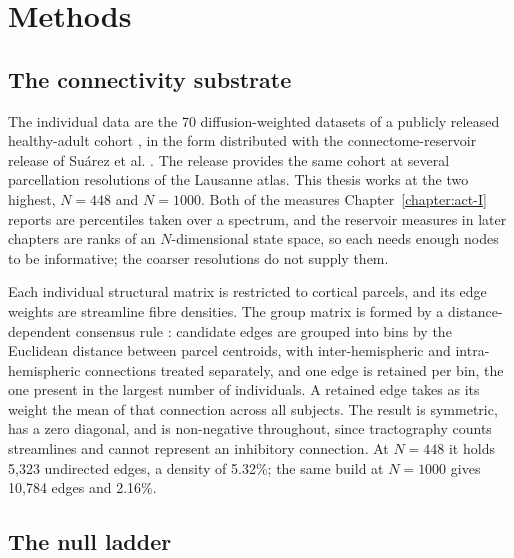 \chapter{Methods}
\label{chapter:methods}


\section{The connectivity substrate}
\label{sec:methods-substrate}
\bigskip

The individual data are the 70 %
diffusion-weighted datasets of a publicly released healthy-adult
cohort \cite{griffa2019structural}, in the form distributed with the
connectome-reservoir release of Suárez et al. \cite{suarez2021learning}. The
release provides the same cohort at several parcellation resolutions of the
Lausanne atlas. This thesis works at the two highest,
$N = 448$ and $N = 1000$. %
Both of the measures Chapter~\ref{chapter:act-I} reports are percentiles taken
over a spectrum, and the reservoir measures in later chapters are ranks of an
$N$-dimensional state space, so each needs enough nodes to be informative; the
coarser resolutions do not supply them.

Each individual structural matrix is restricted to cortical parcels, and its
edge weights are streamline fibre densities. The group matrix is formed by a
distance-dependent consensus rule \cite{betzel2019distance}: candidate edges are
grouped into bins by the Euclidean distance between parcel centroids, with
inter-hemispheric and intra-hemispheric connections treated separately, and one
edge is retained per bin, the one present in the largest number of individuals.
A retained edge takes as its weight the mean of that connection across all
subjects. The result is symmetric, has a zero diagonal, and is non-negative
throughout, since tractography counts streamlines and cannot represent an
inhibitory connection. At $N = 448$ it holds
5{,}323 %
undirected edges, a density of 5.32\%; %
the same build at $N = 1000$ gives
10{,}784 %
edges and 2.16\%. %

\section{The null ladder}
\label{sec:methods-ladder}
\bigskip

